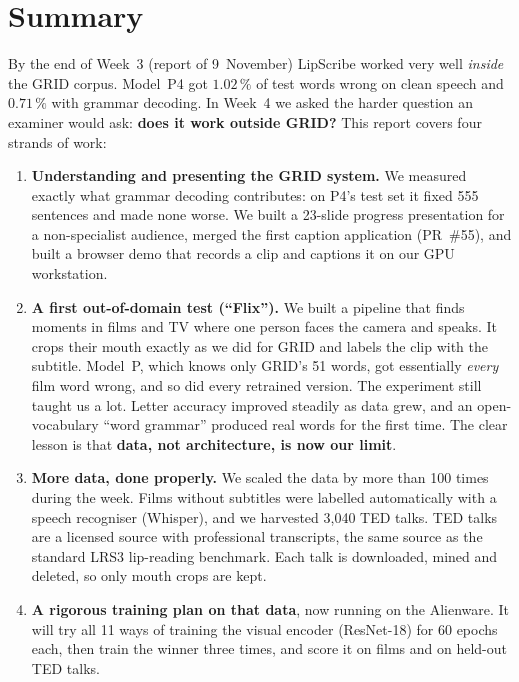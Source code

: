 \documentclass[11pt,a4paper]{article}
\begin{document}

\section{Summary}
By the end of Week~3 (report of 9~November) LipScribe worked very well \emph{inside} the GRID
corpus. Model~P4 got $1.02\,\%$ of test words wrong on clean speech and $0.71\,\%$ with grammar
decoding. In Week~4 we asked the harder question an examiner would ask: \textbf{does it work
outside GRID?} This report covers four strands of work:

\begin{enumerate}
  \item \textbf{Understanding and presenting the GRID system.} We measured exactly what grammar
  decoding contributes: on P4's test set it fixed 555 sentences and made none worse. We built
  a 23-slide progress presentation for a non-specialist audience, merged the first caption
  application (PR~\#55), and built a browser demo that records a clip and captions it on our
  GPU workstation.
  \item \textbf{A first out-of-domain test (``Flix'').} We built a pipeline that finds moments
  in films and TV where one person faces the camera and speaks. It crops their mouth exactly as
  we did for GRID and labels the clip with the subtitle. Model~P, which knows only GRID's
  51 words, got essentially \emph{every} film word wrong, and so did every retrained version.
  The experiment still taught us a lot. Letter accuracy improved steadily as data grew, and an
  open-vocabulary ``word grammar'' produced real words for the first time. The clear lesson is
  that \textbf{data, not architecture, is now our limit}.
  \item \textbf{More data, done properly.} We scaled the data by more than 100 times during
  the week. Films without subtitles were labelled automatically with a speech recogniser
  (Whisper), and we harvested 3,040 TED talks. TED talks are a licensed source with
  professional transcripts, the same source as the standard LRS3 lip-reading benchmark. Each
  talk is downloaded, mined and deleted, so only mouth crops are kept.
  \item \textbf{A rigorous training plan on that data}, now running on the Alienware. It will
  try all 11 ways of training the visual encoder (ResNet-18) for 60 epochs each, then train the
  winner three times, and score it on films and on held-out TED talks.
\end{enumerate}
\end{document}
